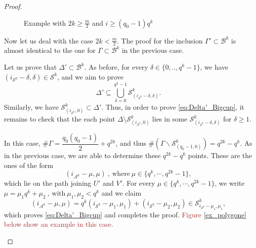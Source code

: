 \documentclass[a4paper]{article}
\newcommand{\calA}{\mathcal{A}}
\newcommand{\calB}{\mathcal{B}}
\newcommand{\calS}{\mathcal{S}}
\newcommand\mathieu[1]{\textcolor{brown}{#1}}
\begin{document}
\begin{proof}
\begin{itemize}
 
\begin{figure}[ht]
\centering
	
\caption{Example with $2k \geq \frac{m}{2}$ and $i \geq (q_0-1)q^k$} \label{ex_in_triangle}

\end{figure}
\end{itemize}

Now let us deal with the case $2k < \frac{m}{2}$. The proof for the inclusion $\Gamma' \subset \calB^k$ is almost identical to the one for $\Gamma \subset \calB^k$ in the previous case.

Let us prove that $\Delta' \subset \calB^k$. As before, for every $\delta \in \{0,..,q^k-1\}$, we have $(i_{\calS^k}-\delta,\delta) \in \calS^k$, and we aim to prove
\begin{equation} \label{eq:Delta'_Bigcup}
	\Delta' \subseteq \bigcup_{\delta=0}^{q^k-1} \calS^k_{(i_{\calS^k}-\delta,\delta)}.
\end{equation}
Similarly, we have $\calS^k_{(i_{\calS^k},0)} \subset \Delta'$. Thus, in order to prove \eqref{eq:Delta'_Bigcup}, it remains to check that the each point
$\Delta \setminus  \calS^k_{(i_{\calS^k},0)}$ lies in some $\calS^k_{(i_{\calS^k}-\delta,\delta)}$ for $\delta\geq 1$.

In this case, $ \# \Gamma = \dfrac{q_0(q_0-1)}{2}+q^{2k}$, and thus $\# (\Gamma \backslash  \calS^k_{(q_0-1,0)}) = q^{2k}-q^k$. As in the previous case, we are able to determine these $q^{2k}-q^k$ points. These are the ones of the form
\[ (i_{\calA^k}-\mu,\mu) \ , \ \mathrm{where} \ \mu \in \{q^k,\cdots,q^{2k}-1\},\]
which lie on the path joining $U'$ and $V'$. 
For every $\mu \in \{q^k,\cdots,q^{2k}-1\}$, we write $\mu = \mu_1 q^k + \mu_2 \ , \ \mathrm{with} \ \mu_1,\mu_2 < q^k$ and we claim  \[(i_{\calA^k}-\mu,\mu)=q^k(i_{\calS^k}-\mu_1,\mu_1)+(i_{\calS^k}-\mu_2,\mu_2) \in \calS^k_{i_{\calS^k}-\mu_1,\mu_1},\]
which proves \eqref{eq:Delta'_Bigcup} and completes the proof.
\mathieu{Figure \ref{ex_polygone} below show an example in this case.}

\begin{figure}[ht]
\begin{center}
\end{center}
\end{figure}
\end{proof}
\end{document}
